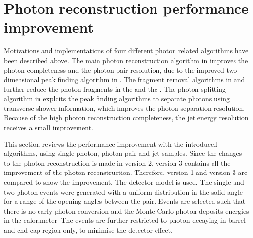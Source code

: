 \section{Photon reconstruction performance improvement}
\label{sec:photonPerformanceCompare}



Motivations and implementations of four different photon related algorithms have been described above. The main photon reconstruction algorithm in  improves the photon completeness and the photon pair resolution, due to the improved two dimensional peak finding algorithm in . The fragment removal algorithms in  and  further reduce the photon fragments in the \ECAL and the \HCAL. The photon splitting algorithm in  exploits the peak finding algorithms to separate photons using transverse shower information, which improves the photon separation resolution. Because of the high photon reconstruction completeness, the jet energy resolution receives a small improvement.

This section reviews the performance improvement with the introduced algorithms, using single photon, photon pair and jet samples. Since the changes to the photon reconstruction is made in \pandora version 2, version 3 contains all the improvement of the photon reconstruction. Therefore, version 1 and version 3 are compared to show the improvement. The \ILD detector model is used. The single and two photon events were generated with a uniform distribution in the solid angle for a range of the opening angles between the pair. Events are selected such that there is no early photon conversion and the Monte Carlo photon deposits energies in the calorimeter. The events are further restricted to photon decaying in barrel and end cap region only, to minimise the detector effect.



